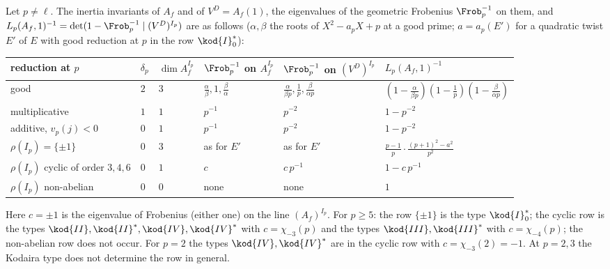 \begin{proposition}\label{prop:blochkato:local-adjoint}
Let $p\ne\ell$. The inertia invariants of $A_f$ and of $V^D=A_f(1)$, the eigenvalues of the geometric Frobenius $\Frob_p^{-1}$ on them, and
$L_p(A_f,1)^{-1}=\det(1-\Frob_p^{-1}\mid(V^D)^{I_p})$ are as follows ($\alpha,\beta$ the roots of $X^2-a_pX+p$ at a good prime; $a=a_p(E')$ for a quadratic twist $E'$ of
$E$ with good reduction at $p$ in the row $\kod{I}_0^*$):
\begin{center}\small\setlength{\tabcolsep}{3pt}
\begin{tabular}{llllll}
\toprule
reduction at $p$ & $\delta_p$ & $\dim A_f^{I_p}$ & $\Frob_p^{-1}$ on $A_f^{I_p}$ & $\Frob_p^{-1}$ on $(V^D)^{I_p}$ & $L_p(A_f,1)^{-1}$\\
\midrule
good & $2$ & $3$ & $\frac\alpha\beta,1,\frac\beta\alpha$ & $\frac{\alpha}{\beta p},\frac1p,\frac{\beta}{\alpha p}$ & $(1-\frac{\alpha}{\beta p})(1-\frac1p)(1-\frac{\beta}{\alpha p})$\\
multiplicative & $1$ & $1$ & $p^{-1}$ & $p^{-2}$ & $1-p^{-2}$\\
additive, $v_p(j)<0$ & $0$ & $1$ & $p^{-1}$ & $p^{-2}$ & $1-p^{-2}$\\
$\rho(I_p)=\{\pm1\}$ & $0$ & $3$ & as for $E'$ & as for $E'$ & $\frac{p-1}p\cdot\frac{(p+1)^2-a^2}{p^2}$\\
$\rho(I_p)$ cyclic of order $3,4,6$ & $0$ & $1$ & $c$ & $c\,p^{-1}$ & $1-c\,p^{-1}$\\
$\rho(I_p)$ non-abelian & $0$ & $0$ & none & none & $1$\\
\bottomrule
\end{tabular}
\end{center}
Here $c=\pm1$ is the eigenvalue of Frobenius (either one) on the line $(A_f)^{I_p}$. For $p\ge5$: the row $\{\pm1\}$ is the type $\kod{I}_0^*$; the cyclic row
is the types $\kod{II},\kod{II}^*,\kod{IV},\kod{IV}^*$ with $c=\chi_{-3}(p)$ and the types $\kod{III},\kod{III}^*$ with $c=\chi_{-4}(p)$; the non-abelian row does not
occur. For $p=2$ the types $\kod{IV},\kod{IV}^*$ are in the cyclic row with $c=\chi_{-3}(2)=-1$. At $p=2,3$ the Kodaira type does not determine the row in
general.
\end{proposition}

